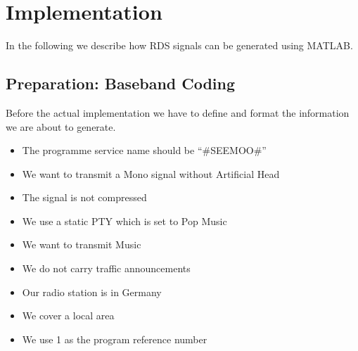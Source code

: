 \documentclass[sigconf]{acmart}
\begin{document}



\section{Implementation}

In the following we describe how RDS signals can be generated using MATLAB.

\hypertarget{Preparation:ux20Basebandux20Coding}{%
\subsection{Preparation: Baseband
Coding}\label{Preparation:ux20Basebandux20Coding}}

Before the actual implementation we have to define and format the
information we are about to generate.

\begin{itemize}
\item The programme service name should be ``\#SEEMOO\#''
\item We want to transmit a Mono signal without Artificial Head
\item The signal is not compressed
\item We use a static PTY which is set to Pop Music
\item We want to transmit Music
\item We do not carry traffic announcements
\item Our radio station is in Germany
\item We cover a local area
\item We use 1 as the program reference number
\end{itemize}
\end{document}
